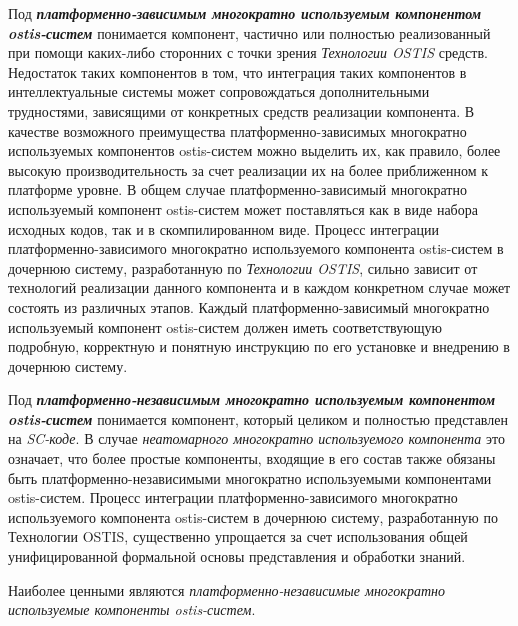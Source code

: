 Под \textbf{\textit{платформенно-зависимым многократно используемым компонентом ostis-систем}} понимается компонент, частично или полностью реализованный при помощи каких-либо сторонних с точки зрения \textit{Технологии OSTIS} средств. Недостаток таких компонентов в том, что интеграция таких компонентов в интеллектуальные системы может сопровождаться дополнительными трудностями, зависящими от конкретных средств реализации компонента. В качестве возможного преимущества платформенно-зависимых многократно используемых компонентов ostis-систем можно выделить их, как правило, более высокую производительность за счет реализации их на более приближенном к платформе уровне. В общем случае платформенно-зависимый многократно используемый компонент ostis-систем может поставляться как в виде набора исходных кодов, так и в скомпилированном виде. Процесс интеграции платформенно-зависимого многократно используемого компонента ostis-систем в дочернюю систему, разработанную по \textit{Технологии OSTIS}, сильно зависит от технологий реализации данного компонента и в каждом конкретном случае может состоять из различных этапов. Каждый платформенно-зависимый многократно используемый компонент ostis-систем должен иметь соответствующую подробную, корректную и понятную инструкцию по его установке и внедрению в дочернюю систему.

Под \textbf{\textit{платформенно-независимым многократно используемым компонентом ostis-систем}} понимается компонент, который целиком и полностью представлен на \textit{SC-коде}. В случае \textit{неатомарного многократно используемого компонента} это означает, что  более простые компоненты, входящие в его состав также обязаны быть платформенно-независимыми многократно используемыми компонентами ostis-систем. Процесс интеграции платформенно-зависимого многократно используемого компонента ostis-систем в дочернюю систему, разработанную по Технологии OSTIS, существенно упрощается за счет использования общей унифицированной формальной основы представления и обработки знаний.

Наиболее ценными являются \textit{платформенно-независимые многократно используемые компоненты ostis-систем}.

